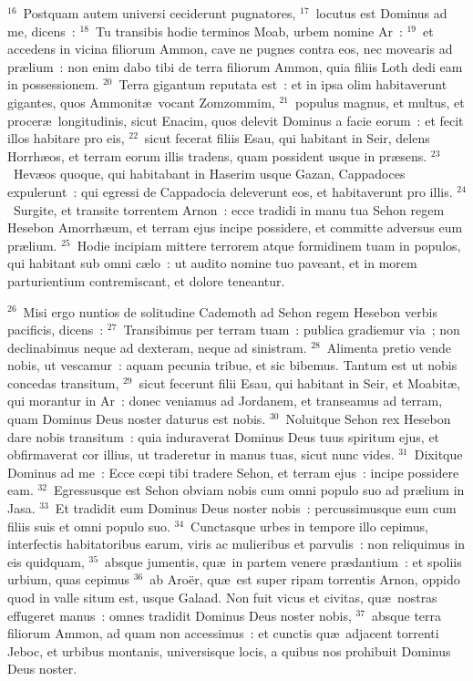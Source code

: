 ${}^{16}$~Postquam autem universi ceciderunt pugnatores,
${}^{17}$~locutus est Dominus ad me, dicens~:
${}^{18}$~Tu transibis hodie terminos Moab, urbem nomine Ar~:
${}^{19}$~et accedens in vicina filiorum Ammon, cave ne pugnes contra eos, nec movearis ad pr\ae lium~: non enim dabo tibi de terra filiorum Ammon, quia filiis Loth dedi eam in possessionem.
${}^{20}$~Terra gigantum reputata est~: et in ipsa olim habitaverunt gigantes, quos Ammonit\ae\ vocant Zomzommim,
${}^{21}$~populus magnus, et multus, et procer\ae\ longitudinis, sicut Enacim, quos delevit Dominus a facie eorum~: et fecit illos habitare pro eis,
${}^{22}$~sicut fecerat filiis Esau, qui habitant in Seir, delens Horrh\ae os, et terram eorum illis tradens, quam possident usque in pr\ae sens.
${}^{23}$~Hev\ae os quoque, qui habitabant in Haserim usque Gazan, Cappadoces expulerunt~: qui egressi de Cappadocia deleverunt eos, et habitaverunt pro illis.
${}^{24}$~Surgite, et transite torrentem Arnon~: ecce tradidi in manu tua Sehon regem Hesebon Amorrh\ae um, et terram ejus incipe possidere, et committe adversus eum pr\ae lium.
${}^{25}$~Hodie incipiam mittere terrorem atque formidinem tuam in populos, qui habitant sub omni c\ae lo~: ut audito nomine tuo paveant, et in morem parturientium contremiscant, et dolore teneantur.


${}^{26}$~Misi ergo nuntios de solitudine Cademoth ad Sehon regem Hesebon verbis pacificis, dicens~:
${}^{27}$~Transibimus per terram tuam~: publica gradiemur via~; non declinabimus neque ad dexteram, neque ad sinistram.
${}^{28}$~Alimenta pretio vende nobis, ut vescamur~: aquam pecunia tribue, et sic bibemus. Tantum est ut nobis concedas transitum,
${}^{29}$~sicut fecerunt filii Esau, qui habitant in Seir, et Moabit\ae , qui morantur in Ar~: donec veniamus ad Jordanem, et transeamus ad terram, quam Dominus Deus noster daturus est nobis.
${}^{30}$~Noluitque Sehon rex Hesebon dare nobis transitum~: quia induraverat Dominus Deus tuus spiritum ejus, et obfirmaverat cor illius, ut traderetur in manus tuas, sicut nunc vides.
${}^{31}$~Dixitque Dominus ad me~: Ecce cœpi tibi tradere Sehon, et terram ejus~: incipe possidere eam.
${}^{32}$~Egressusque est Sehon obviam nobis cum omni populo suo ad pr\ae lium in Jasa.
${}^{33}$~Et tradidit eum Dominus Deus noster nobis~: percussimusque eum cum filiis suis et omni populo suo.
${}^{34}$~Cunctasque urbes in tempore illo cepimus, interfectis habitatoribus earum, viris ac mulieribus et parvulis~: non reliquimus in eis quidquam,
${}^{35}$~absque jumentis, qu\ae\ in partem venere pr\ae dantium~: et spoliis urbium, quas cepimus
${}^{36}$~ab Aro\"er, qu\ae\ est super ripam torrentis Arnon, oppido quod in valle situm est, usque Galaad. Non fuit vicus et civitas, qu\ae\ nostras effugeret manus~: omnes tradidit Dominus Deus noster nobis,
${}^{37}$~absque terra filiorum Ammon, ad quam non accessimus~: et cunctis qu\ae\ adjacent torrenti Jeboc, et urbibus montanis, universisque locis, a quibus nos prohibuit Dominus Deus noster.

